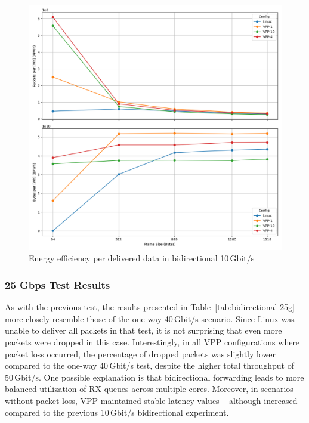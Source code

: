 \begin{figure}[!htbp]
    \centering
    \includegraphics[width=\linewidth]{images/consumption-bi-10g.png}
    \caption{Energy efficiency per delivered data in bidirectional 10\,Gbit/s}
    \label{fig:bi-10g}
\end{figure}

\subsubsection{25 Gbps Test Results}

As with the previous test, the results presented in Table~\ref{tab:bidirectional-25g} more closely resemble those of the one-way 40\,Gbit/s scenario.  
Since Linux was unable to deliver all packets in that test, it is not surprising that even more packets were dropped in this case.  
Interestingly, in all VPP configurations where packet loss occurred, the percentage of dropped packets was slightly lower compared to the one-way 40\,Gbit/s test, 
despite the higher total throughput of 50\,Gbit/s.  
One possible explanation is that bidirectional forwarding leads to more balanced utilization of RX queues across multiple cores.  
Moreover, in scenarios without packet loss, VPP maintained stable latency values -- although increased compared to the previous 10\,Gbit/s bidirectional experiment.

